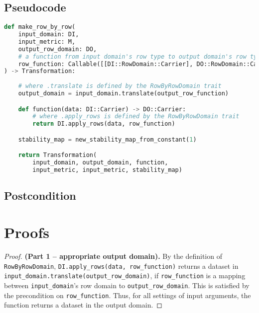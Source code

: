 \documentclass{article}
\begin{document}
\subsection*{Pseudocode}
\begin{lstlisting}[language = Python, escapechar=|]
def make_row_by_row(
    input_domain: DI, 
    input_metric: M, 
    output_row_domain: DO, 
    # a function from input domain's row type to output domain's row type
    row_function: Callable([[DI::RowDomain::Carrier], DO::RowDomain::Carrier])
) -> Transformation:
    
    # where .translate is defined by the RowByRowDomain trait
    output_domain = input_domain.translate(output_row_function)

    def function(data: DI::Carrier) -> DO::Carrier:
        # where .apply_rows is defined by the RowByRowDomain trait
        return DI.apply_rows(data, row_function)

    stability_map = new_stability_map_from_constant(1)

    return Transformation(
        input_domain, output_domain, function,
        input_metric, input_metric, stability_map)
\end{lstlisting}

\subsection*{Postcondition}

\section{Proofs}

\begin{proof} \textbf{(Part 1 -- appropriate output domain).}
    By the definition of \texttt{RowByRowDomain}, \texttt{DI.apply\_rows(data, row\_function)} returns a dataset in \texttt{input\_domain.translate(output\_row\_domain)},
    if \texttt{row\_function} is a mapping between \texttt{input\_domain}'s row domain to \texttt{output\_row\_domain}.
    This is satisfied by the precondition on \texttt{row\_function}.
    Thus, for all settings of input arguments, the function returns a dataset in the output domain.
\end{proof}
\end{document}
